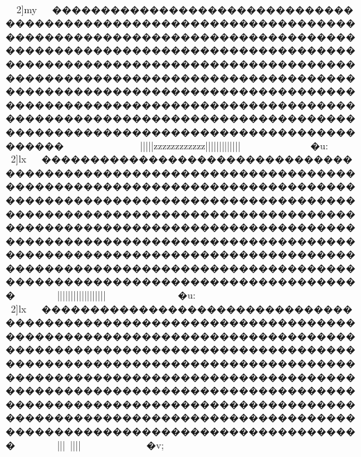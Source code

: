 {{{{{{{{{{{{{{{{{{{{{{{{{{{{{{{{{{{{{{{{{{{{{{{{{{{{{{{{{{{{{{{{{{{{{{{{{{{{{{{{{{{{{{{{{{{{{{{{{{{{{{{{{{{{{{{{{{{{{{{{{{{{{{{{{{{{{{{{{{{{{{{{{{{{{{{{{{{{{{{{{{{{{{{{{{{{{{{{{{{{{{{{{{{{{{{{{{{{{{{{{{{{{{{{{{{{{{{{{{{{{{{{{{{{{{{{{{{{{{{{{{{{{{{{{{{{{{{{{{{{{{{{{{{{{{{{{{{{{{{{{{{{{{{{{{{{{{{{{{{{{{{{{{{{{{{{{{{{{{{{{{{{{{{{{{{{{{{{{{{{{{{{{{{{{{{{{{{{{{{{{{{{{{{{{{{{{{{{{{{{{{{{{{{{{{{{{{{{{{{{{{{{{{{{{{{{{{{{{{{{{{{{{{{{{{{{{{{{{{{{{{{{{{{{{{{{{{{{{{{{{{{{{{{{{{{{{{{{{{{{{{{{{{{{{{{{{{{{{{{{{{{{{{{{{{{{{{{{{{{{{{{{{{{{{{{{{{{{{{{{{{{{{{{{{{{{{{{{{{{{{{{{{{{{{{{{{{{{{{{{{{{{{{{{{{{{{{{{{{{{{{{{{{{{{{{{{{{{{{{{{{{{{{{{{{{{{{{{{{{{{{{{{{{{{{{{{{{{{{{{{{{{{{{{{{{{{{{{{{{{{{{{{{{{{{{{{{{{{{{{{{{{{{{{{{{{{{{{{{{{{{{{{{{{{{{{{{{{{{{{{{{{{{{{{{{{{{{{{{{{{{{{{{{{{{{{{{{{{{{{{{{{{{{{{{{{{{{{{{{{{{{{{{{{{{{{{{{{{{	2]my{}~~�������������������������������������������������������������������������������������������������������������������������������������������������������������������������������������������������������������������������������������������������������������������������������������������������������������������������������������������������������������������������~~~~~~~~~~~~~~}}}|||||{{{{{{{{{{{{{{{{{{zzzzzzzzzzzz{{{{{{||||||||||||{{{|}~~~~~~~~~~~�u:

	2]lx{}~~���������������������������������������������������������������������������������������������������������������������������������������������������������������������������������������������������������������������������������������������������������������������������������������������������������������������������������������������������������������������~~~}}}}}}}}}}}}}|||{{{{{{{{{{{{{{{{{{{{{{{{{{{{{{{{{{{{|}||||||||||||||}~~~~~~~~~~~~�u:

	2]lx{}~~���������������������������������������������������������������������������������������������������������������������������������������������������������������������������������������������������������������������������������������������������������������������������������������������������������������������������������������������������������������������~~~}}}}}}}}}}}}}|||{{{{{{{{{{{{{{{{{{{{{{{{{{{{{{{{{{{{}~}}}}}}}}}}||||}~~~~~~~~~�v;

}}}}}}}}}}}}}}}}}}}}}}}}}}}}}}}}}}}}}}}}}}}}}}}}}}}}}}}}}}}}}}}}}}}}}}}}}}}}}}}}}}}}}}}}}}}}}}}}}}}}}}}}}}}}}}}}}}}}}}}}}}}}}}}}}}}}}}}}}}}}}}}}}}}}}}}}}}}}}}}}}}}}}}}}}}}}}}}}}}}}}}}}}}}}}}}}}}}}}}}}}}}}}}}}}}}}}}}}}}}}}}}}}}}}}}}}}}}}}}}}}}}}}}}}}}}}}}}}}}}}}}}}}}}}}}}}}}}}}}}}}}}}}}}}}}}}}}}}}}}}}}}}}}}}}}}}}}}}}}}}}}}}}}}}}}}}}}}}}}}}}}}}}}}}}}}}}}}}}}}}}}}}}}}}}}}}}}}}}}}}}}}}}}}}}}}}}}}}}}}}}}}}}}}}}}}}}}}}}}}}}}}}}}}}}}}}}}}}}}}}}}}}}}}}}}}}}}}}}}}}}}}}}}}}}}}}}}}}}}}}}}}}}}}}}}}}}}}}}}}}}}}}}}}}}}}}}}}}}}}}}}}}}}}}}}}}}}}}}}}}}}}}}}}}}}}}}}}}}}}}}}}}}}}}}}}}}}}}}}}}}}}}}}}}}}}}}}}}}}}}}}}}}}}}}}}}}}}}}}}}}}}}}}}}}}}}}}}}}}}}}}}}}}}}}}}}}}}}}}}}}}}}}}}}}}}}}}}}}}}}}}}}}}}}}}}}}}}}}}}}}}}}}}}}}}}}}}}}}}}}}}}}}}}}}}}}}}}}}}}}}}}}}}}}}}}}}}}}}}}}}}}}}}}}}}}}}}}}}}}}}}}}}}}}}}}}}}}}}}}}}}}}}}}}}}}}}}}}}}}}}}}}}}}}}}}}}}}}}}}}}}}}}}}}}}}}}}}}}}}}}}}}}}}}}}}}}
